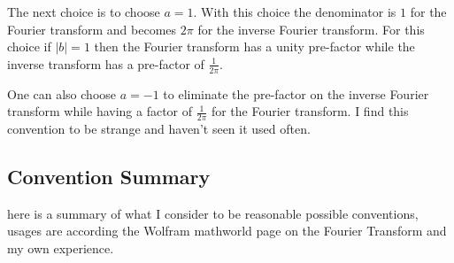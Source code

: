 \documentclass[12pt]{article}
\begin{document}
The next choice is to choose $a=1$. With this choice the denominator is $1$ for the Fourier transform and becomes $2\pi$ for the inverse Fourier transform. For this choice if $|b|=1$ then the Fourier transform has a unity pre-factor while the inverse transform has a pre-factor of $\frac{1}{2\pi}$.

One can also choose $a=-1$ to eliminate the pre-factor on the inverse Fourier transform while having a factor of $\frac{1}{2\pi}$ for the Fourier transform. I find this convention to be strange and haven't seen it used often.

\subsection{Convention Summary}

here is a summary of what I consider to be reasonable possible conventions, usages are according the Wolfram  mathworld page on the Fourier Transform and my own experience.
\setlength{\extrarowheight}{3pt}
\end{document}
